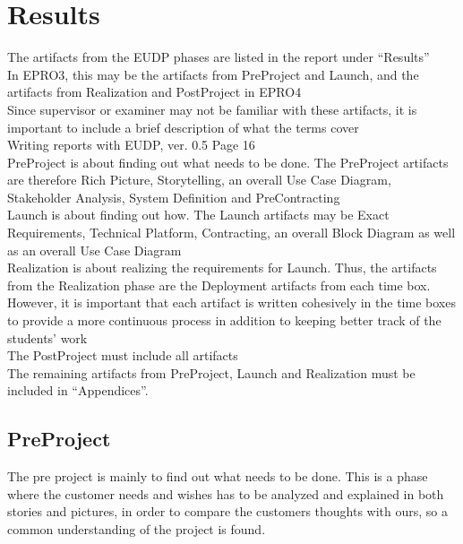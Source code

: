 \documentclass[12pt,a4paper]{report}
\begin{document}


\chapter{Results}
The artifacts from the EUDP phases are listed in the report under “Results”\\

In EPRO3, this may be the artifacts from PreProject and Launch, and the artifacts from Realization and PostProject in EPRO4\\

Since supervisor or examiner may not be familiar with these artifacts, it is important to include a brief description of what the terms cover\\

Writing reports with EUDP, ver. 0.5 Page 16\\

PreProject is about finding out what needs to be done. The PreProject artifacts are therefore Rich Picture, Storytelling, an overall Use Case Diagram, Stakeholder Analysis, System Definition and PreContracting\\

Launch is about finding out how. The Launch artifacts may be Exact Requirements, Technical Platform, Contracting, an overall Block Diagram as well as an overall Use Case Diagram\\

Realization is about realizing the requirements for Launch. Thus, the artifacts from the Realization phase are the Deployment artifacts from each time box. However, it is important that each artifact is written cohesively in the time boxes to provide a more continuous process in addition to keeping better track of the students’ work\\

The PostProject must include all artifacts\\

The remaining artifacts from PreProject, Launch and Realization must be included in “Appendices”.\\

\section{PreProject}
The pre project is mainly to find out what needs to be done. This is a phase where the customer needs and wishes has to be analyzed and explained in both stories and pictures, in order to compare the customers thoughts with ours, so a common understanding of the project is found.
\end{document}
